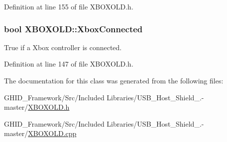 \-Definition at line 155 of file \-X\-B\-O\-X\-O\-L\-D.\-h.

\hypertarget{class_x_b_o_x_o_l_d_aa091ff52ba7ad4216b0cd0f18651b755}{
\subsubsection[{\-Xbox\-Connected}]{\setlength{\rightskip}{0pt plus 5cm}bool {\bf \-X\-B\-O\-X\-O\-L\-D\-::\-Xbox\-Connected}}}\label{class_x_b_o_x_o_l_d_aa091ff52ba7ad4216b0cd0f18651b755}
\-True if a \-Xbox controller is connected. 

\-Definition at line 147 of file \-X\-B\-O\-X\-O\-L\-D.\-h.



\-The documentation for this class was generated from the following files\-:\begin{DoxyCompactItemize}
\item 
\-G\-H\-I\-D\-\_\-\-Framework/\-Src/\-Included Libraries/\-U\-S\-B\-\_\-\-Host\-\_\-\-Shield\-\_.-\/master/\hyperlink{_x_b_o_x_o_l_d_8h}{\-X\-B\-O\-X\-O\-L\-D.\-h}\item 
\-G\-H\-I\-D\-\_\-\-Framework/\-Src/\-Included Libraries/\-U\-S\-B\-\_\-\-Host\-\_\-\-Shield\-\_.-\/master/\hyperlink{_x_b_o_x_o_l_d_8cpp}{\-X\-B\-O\-X\-O\-L\-D.\-cpp}\end{DoxyCompactItemize}

